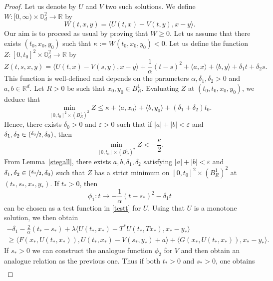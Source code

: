 \documentclass[10pt]{amsart}
\let\epsilon\varepsilon
\theoremstyle{definition}
\begin{document}
\begin{proof}
Let us denote by $U$ and $V$ two such solutions. We define \hbox{$W: [0,\infty)\!\times\!\mathbb{O}_d^2\!\to\!\mathbb{R}$} by
\begin{equation*}
W(t,x,y) = \langle U(t,x)-V(t,y), x- y \rangle.
\end{equation*}
Our aim is to proceed as usual by proving that $W \geq 0$. Let us assume that there exists $(t_0,x_0,y_0)$ such that $\kappa:= W(t_0,x_0,y_0) < 0$. Let us define the function \hbox{$Z: [0,t_0]^2 \times \mathbb{O}_d^2 \to \mathbb{R}$} by
\begin{equation*}
Z(t,s,x,y) = \langle U(t,x)-V(s,y),x-y \rangle+\frac{1}{\alpha}(t-s)^2+\langle a , x\rangle+\langle b,y\rangle+\delta_1 t+\delta_2 s.
\end{equation*}
This function is well-defined and depends on the parameters $\alpha,\delta_1,\delta_2\!>\!0$ and $a,b\!\in\!\mathbb{R}^d$. Let $R > 0$ be such that $x_0,y_0 \in B^1_R$. Evaluating $Z$ at $(t_0,t_0,x_0,y_0)$, we deduce that
\[
\min_{[0,t_0]^2\times (B^1_R)^2} Z \leq \kappa+\langle a , x_0\rangle+\langle b,y_0\rangle+(\delta_1+\delta_2) t_0.
\]
Hence, there exists $\delta_0 > 0$ and $\epsilon > 0$ such that if $|a|+|b| < \epsilon$ and $\delta_1,\delta_2 \in(\sfrac{\delta_0}{2}, \delta_0)$, then
\begin{equation}\label{hypwrong}
\min_{[0,t_0]\times (B^1_R)^2} Z < -\frac{\kappa}{2}.
\end{equation}
From Lemma~\ref{stegall}, there exists $a,b,\delta_1, \delta_2$ satisfying $|a|+|b| < \epsilon$ and $\delta_1,\delta_2 \in(\sfrac{\delta_0}{2}, \delta_0)$ such that $Z$ has a strict minimum on $[0,t_0]^2 \times (B^1_R)^2$ at $(t_*,s_*,x_*,y_*)$. If $t_*> 0$, then
\begin{equation*}
\phi_1: t \to-\frac{1}{\alpha}(t-s_*)^2-\delta_1 t
\end{equation*}
can be chosen as a test function in \eqref{testt} for $U$. Using that $U$ is a monotone solution, we then obtain
\begin{multline*}
- \delta_1- \frac{2}{\alpha}(t_*-s_*)+\lambda \langle U(t_*,x_*)-T^*U(t_*,Tx_*),x_*-y_* \rangle \\
\geq
\langle F(x_*,U(t_*,x_*)), U(t_*,x_*)-V(s_*,y_*)+a\rangle+\langle G(x_*,U(t_*,x_*)), x_*-y_* \rangle.
\end{multline*}
If $s_* > 0$ we can construct the analogue function $\phi_2$ for $V$ and then obtain an analogue relation as the previous one. Thus if both $t_* > 0 $ and $s_* > 0$, one obtains
\begin{multline}\label{int47}

\end{multline}
\end{proof}
\end{document}
